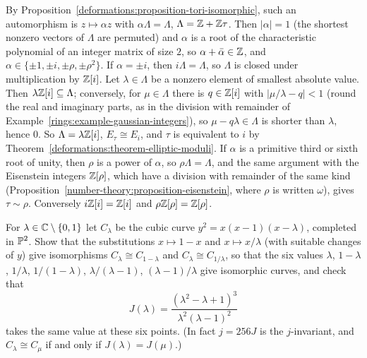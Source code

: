 \begin{solution}
By Proposition~\ref{deformations:proposition-tori-isomorphic}, such an automorphism is $z \mapsto \alpha z$ with $\alpha\Lambda = \Lambda$, $\Lambda = \mathbb{Z} + \mathbb{Z}\tau$. Then $|\alpha| = 1$ (the shortest nonzero vectors of $\Lambda$ are
permuted) and $\alpha$ is a root of the characteristic polynomial of an integer matrix of size $2$, so $\alpha + \bar\alpha \in \mathbb{Z}$, and $\alpha \in \{\pm1, \pm i, \pm\rho, \pm\rho^2\}$. If $\alpha = \pm i$, then
$i\Lambda = \Lambda$, so $\Lambda$ is closed under multiplication by $\mathbb{Z}[i]$. Let $\lambda \in \Lambda$ be a nonzero element of smallest absolute value. Then $\lambda\mathbb{Z}[i] \subseteq \Lambda$; conversely, for
$\mu \in \Lambda$ there is $q \in \mathbb{Z}[i]$ with $|\mu/\lambda - q| < 1$ (round the real and imaginary parts, as in the division with remainder of Example~\ref{rings:example-gaussian-integers}), so
$\mu - q\lambda \in \Lambda$ is shorter than $\lambda$, hence $0$. So $\Lambda = \lambda\mathbb{Z}[i]$, $E_\tau \cong E_i$, and $\tau$ is equivalent to $i$ by Theorem~\ref{deformations:theorem-elliptic-moduli}. If $\alpha$ is a
primitive third or sixth root of unity, then $\rho$ is a power of $\alpha$, so $\rho\Lambda = \Lambda$, and the same argument with the Eisenstein integers $\mathbb{Z}[\rho]$, which have a division with remainder
of the same kind (Proposition~\ref{number-theory:proposition-eisenstein}, where $\rho$ is written $\omega$), gives $\tau \sim \rho$. Conversely $i\mathbb{Z}[i] = \mathbb{Z}[i]$ and $\rho\mathbb{Z}[\rho] = \mathbb{Z}[\rho]$.
\end{solution}

\begin{exercise}\label{deformations:exercise-legendre-family}
For $\lambda \in \mathbb{C} \setminus \{0, 1\}$ let $C_\lambda$ be the cubic curve $y^2 = x(x - 1)(x - \lambda)$, completed in $\mathbb{P}^2$. Show that the substitutions $x \mapsto 1 - x$ and $x \mapsto x/\lambda$ (with suitable changes
of $y$) give isomorphisms $C_\lambda \cong C_{1 - \lambda}$ and $C_\lambda \cong C_{1/\lambda}$, so that the six values $\lambda$, $1 - \lambda$, $1/\lambda$, $1/(1 - \lambda)$, $\lambda/(\lambda - 1)$, $(\lambda - 1)/\lambda$
give isomorphic curves, and check that
\[
J(\lambda) = \frac{(\lambda^2 - \lambda + 1)^3}{\lambda^2(\lambda - 1)^2}
\]
takes the same value at these six points. (In fact $j = 256J$ is the $j$-invariant, and $C_\lambda \cong C_\mu$ if and only if $J(\lambda) = J(\mu)$.)
\end{exercise}

